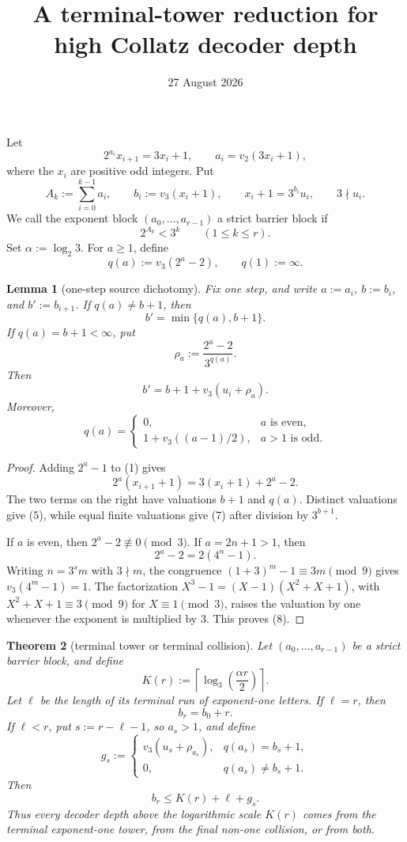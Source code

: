 \documentclass[11pt]{article}
\title{A terminal-tower reduction for high Collatz decoder depth}
\author{}
\date{27 August 2026}
\newtheorem{theorem}{Theorem}
\newtheorem{lemma}[theorem]{Lemma}
\begin{document}
\maketitle

Let
\[
  2^{a_i}x_{i+1}=3x_i+1,
  \qquad
  a_i=v_2(3x_i+1),
  \tag{1}
\]
where the $x_i$ are positive odd integers.  Put
\[
  A_k:=\sum_{i=0}^{k-1}a_i,
  \qquad
  b_i:=v_3(x_i+1),
  \qquad
  x_i+1=3^{b_i}u_i,
  \qquad
  3\nmid u_i.
  \tag{2}
\]
We call the exponent block $(a_0,\ldots,a_{r-1})$ a strict barrier block if
\[
  2^{A_k}<3^k
  \qquad(1\leq k\leq r).
  \tag{3}
\]
Set $\alpha:=\log_2 3$.  For $a\geq1$, define
\[
  q(a):=v_3(2^a-2),
  \qquad q(1):=\infty.
  \tag{4}
\]

\begin{lemma}[one-step source dichotomy]
Fix one step, and write $a:=a_i$, $b:=b_i$, and $b':=b_{i+1}$.  If
$q(a)\neq b+1$, then
\[
  b'=\min\{q(a),b+1\}.
  \tag{5}
\]
If $q(a)=b+1<\infty$, put
\[
  \rho_a:=\frac{2^a-2}{3^{q(a)}}.
  \tag{6}
\]
Then
\[
  b'=b+1+v_3(u_i+\rho_a).
  \tag{7}
\]
Moreover,
\[
  q(a)=
  \begin{cases}
    0,&a\text{ is even},\\
    1+v_3((a-1)/2),&a>1\text{ is odd}.
  \end{cases}
  \tag{8}
\]
\end{lemma}

\begin{proof}
Adding $2^a-1$ to (1) gives
\[
  2^a(x_{i+1}+1)=3(x_i+1)+2^a-2.
  \tag{9}
\]
The two terms on the right have valuations $b+1$ and $q(a)$.  Distinct
valuations give (5), while equal finite valuations give (7) after division
by $3^{b+1}$.

If $a$ is even, then $2^a-2\not\equiv0\pmod3$.  If $a=2n+1>1$, then
\[
  2^a-2=2(4^n-1).
\]
Writing $n=3^s m$ with $3\nmid m$, the congruence
$(1+3)^m-1\equiv3m\pmod9$ gives $v_3(4^m-1)=1$.  The factorization
$X^3-1=(X-1)(X^2+X+1)$, with
$X^2+X+1\equiv3\pmod9$ for $X\equiv1\pmod3$, raises the valuation by one
whenever the exponent is multiplied by $3$.  This proves (8).
\end{proof}

\begin{theorem}[terminal tower or terminal collision]
Let $(a_0,\ldots,a_{r-1})$ be a strict barrier block, and define
\[
  K(r):=\left\lceil\log_3\left(\frac{\alpha r}{2}\right)\right\rceil.
  \tag{10}
\]
Let $\ell$ be the length of its terminal run of exponent-one letters.  If
$\ell=r$, then
\[
  b_r=b_0+r.
  \tag{11}
\]
If $\ell<r$, put $s:=r-\ell-1$, so $a_s>1$, and define
\[
  g_s:=
  \begin{cases}
    v_3(u_s+\rho_{a_s}),&q(a_s)=b_s+1,\\
    0,&q(a_s)\neq b_s+1.
  \end{cases}
  \tag{12}
\]
Then
\[
\boxed{
  b_r\leq K(r)+\ell+g_s.}
\tag{13}
\]
Thus every decoder depth above the logarithmic scale $K(r)$ comes from the
terminal exponent-one tower, from the final non-one collision, or from both.
\end{theorem}
\end{document}
